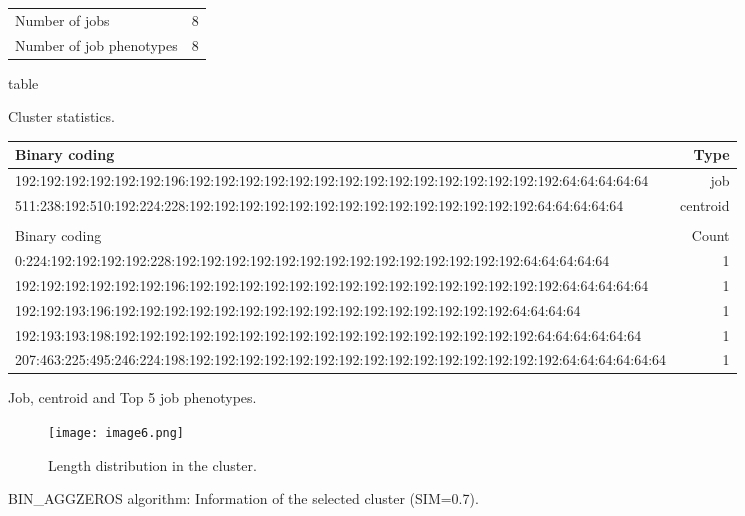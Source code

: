 \documentclass{jhps}
\begin{document}
\begin{figure}
	\begin{subtable}{\textwidth}
		\centering
		\begin{tabular}{ll}
			Number of jobs & 8 \\
			Number of job phenotypes & 8 \\
		\end{tabular}
		\caption{table}{Cluster statistics.}
		\label{cluster:use_case:bin_aggzeros:stats}
	\end{subtable}
	\medskip
	\begin{subtable}{\textwidth}
		\centering
		\begin{tiny}
			\begin{tabular}{l|r}
				\rowcolor{tblhead}
				Binary coding                                                                                             &  Type     \\
				\hline
				192:192:192:192:192:192:196:192:192:192:192:192:192:192:192:192:192:192:192:192:192:192:64:64:64:64:64    &  job      \\
				511:238:192:510:192:224:228:192:192:192:192:192:192:192:192:192:192:192:192:192:192:64:64:64:64:64        &  centroid \\
				\multicolumn{2}{l}{}                                                                                      \\
				\rowcolor{tblhead}
				Binary coding                                                                                             &  Count    \\
				\hline
				0:224:192:192:192:192:228:192:192:192:192:192:192:192:192:192:192:192:192:192:192:64:64:64:64:64          &  1        \\
				192:192:192:192:192:192:196:192:192:192:192:192:192:192:192:192:192:192:192:192:192:192:64:64:64:64:64    &  1        \\
				192:192:193:196:192:192:192:192:192:192:192:192:192:192:192:192:192:192:192:192:64:64:64:64               &  1        \\
				192:193:193:198:192:192:192:192:192:192:192:192:192:192:192:192:192:192:192:192:192:64:64:64:64:64:64     &  1        \\
				207:463:225:495:246:224:198:192:192:192:192:192:192:192:192:192:192:192:192:192:192:192:64:64:64:64:64:64 &  1        \\
			\end{tabular}
		\end{tiny}
		\caption{Job, centroid and Top 5 job phenotypes.}
		\label{cluster:use_case:bin_aggzeros:top_jobs}
	\end{subtable}
	\medskip
	\begin{subfigure}{\textwidth}
		\centering
		\texttt{[image: image6.png]}
		\caption{Length distribution in the cluster.}
		\label{cluster:use_case:bin_aggzeros:length}
	\end{subfigure}
	\caption{BIN\_AGGZEROS algorithm: Information of the selected cluster (SIM=0.7).}
	\label{cluster:use_case:bin_aggzeros}
\end{figure}
\end{document}
